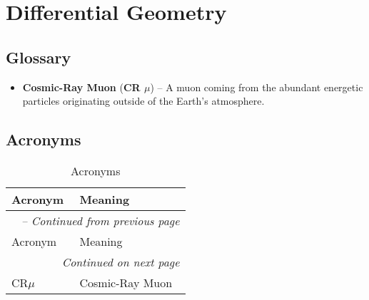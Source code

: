 
\chapter{Differential Geometry}
\label{app_geometry}


\section{Glossary}
\label{jargonapp}
\begin{itemize}
\item \textbf{Cosmic-Ray Muon} (\textbf{CR $\mu$}) -- A muon coming from
the abundant energetic particles originating outside of the Earth's
atmosphere.
\end{itemize}

\section{Acronyms}
\label{acronymsec}

\begin{longtable}{p{} p{}}
\caption{Acronyms} \label{tab:acronyms} \\

\toprule
Acronym & Meaning \\
\midrule
\endfirsthead

\multicolumn{2}{l}{\textit{\tablename\ \thetable{} -- Continued from previous page}} \\
\toprule
Acronym & Meaning \\
\midrule
\endhead

\multicolumn{2}{r}{\textit{Continued on next page}} \\
\bottomrule
\endfoot

\bottomrule
\endlastfoot


CR$\mu$ & Cosmic-Ray Muon \\

\end{longtable}

